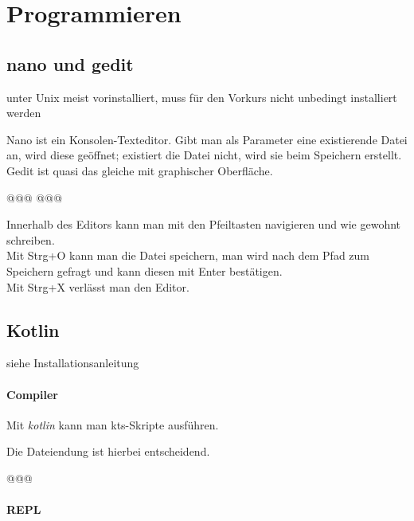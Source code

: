 \section{Programmieren}
\subsection{nano und gedit}
\begin{defBox}
     unter Unix meist vorinstalliert, muss für den Vorkurs nicht unbedingt installiert werden
\end{defBox}
Nano ist ein Konsolen-Texteditor. Gibt man als Parameter eine existierende Datei an, wird diese geöffnet; existiert die Datei nicht, wird sie beim Speichern erstellt. Gedit ist quasi das gleiche mit graphischer Oberfläche.
\begin{commandshell}
@\shellprefix@nano @\textit{}@
@\shellprefix@gedit @\textit{}@
\end{commandshell}
Innerhalb des Editors kann man mit den Pfeiltasten navigieren und wie gewohnt schreiben.\\
Mit Strg+O kann man die Datei speichern, man wird nach dem Pfad zum Speichern gefragt und kann diesen mit Enter bestätigen.\\
Mit Strg+X verlässt man den Editor.

\subsection{Kotlin}
\begin{defBox}
     siehe Installationsanleitung
\end{defBox}
\paragraph*{Compiler}\mbox{}

Mit \textit{kotlin} kann man kts-Skripte ausführen.
\begin{defBox}
     Die Dateiendung ist hierbei entscheidend.
\end{defBox}

\begin{commandshell}
    @\shellprefix@kotlin @\textit{}@
\end{commandshell}

\clearpage
\paragraph*{REPL}\mbox{}

